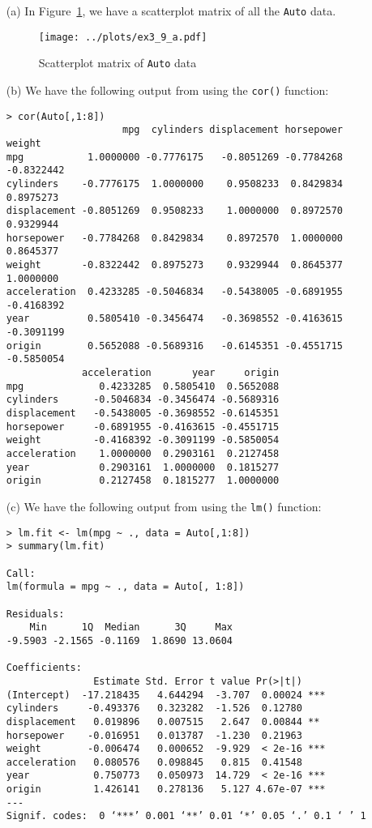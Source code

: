 
\begin{itemize}
    \item[(a)] In Figure~\ref{fig3_9scat}, we have a scatterplot matrix of all the 
        \verb|Auto| data.
        \begin{figure}[!ht]
            \texttt{[image: ../plots/ex3\_9\_a.pdf]}
            \caption{Scatterplot matrix of \texttt{Auto} data \label{fig3_9scat}}
        \end{figure}
    \item[(b)] We have the following output from using the \verb|cor()| function:
        \scriptsize\begin{verbatim}
> cor(Auto[,1:8])
                    mpg  cylinders displacement horsepower     weight
mpg           1.0000000 -0.7776175   -0.8051269 -0.7784268 -0.8322442
cylinders    -0.7776175  1.0000000    0.9508233  0.8429834  0.8975273
displacement -0.8051269  0.9508233    1.0000000  0.8972570  0.9329944
horsepower   -0.7784268  0.8429834    0.8972570  1.0000000  0.8645377
weight       -0.8322442  0.8975273    0.9329944  0.8645377  1.0000000
acceleration  0.4233285 -0.5046834   -0.5438005 -0.6891955 -0.4168392
year          0.5805410 -0.3456474   -0.3698552 -0.4163615 -0.3091199
origin        0.5652088 -0.5689316   -0.6145351 -0.4551715 -0.5850054
             acceleration       year     origin
mpg             0.4233285  0.5805410  0.5652088
cylinders      -0.5046834 -0.3456474 -0.5689316
displacement   -0.5438005 -0.3698552 -0.6145351
horsepower     -0.6891955 -0.4163615 -0.4551715
weight         -0.4168392 -0.3091199 -0.5850054
acceleration    1.0000000  0.2903161  0.2127458
year            0.2903161  1.0000000  0.1815277
origin          0.2127458  0.1815277  1.0000000
        \end{verbatim}\normalsize
    \item[(c)] We have the following output from using the \verb|lm()| function:
        \small\begin{verbatim}
> lm.fit <- lm(mpg ~ ., data = Auto[,1:8])
> summary(lm.fit)

Call:
lm(formula = mpg ~ ., data = Auto[, 1:8])

Residuals:
    Min      1Q  Median      3Q     Max 
-9.5903 -2.1565 -0.1169  1.8690 13.0604 

Coefficients:
               Estimate Std. Error t value Pr(>|t|)    
(Intercept)  -17.218435   4.644294  -3.707  0.00024 ***
cylinders     -0.493376   0.323282  -1.526  0.12780    
displacement   0.019896   0.007515   2.647  0.00844 ** 
horsepower    -0.016951   0.013787  -1.230  0.21963    
weight        -0.006474   0.000652  -9.929  < 2e-16 ***
acceleration   0.080576   0.098845   0.815  0.41548    
year           0.750773   0.050973  14.729  < 2e-16 ***
origin         1.426141   0.278136   5.127 4.67e-07 ***
---
Signif. codes:  0 ‘***’ 0.001 ‘**’ 0.01 ‘*’ 0.05 ‘.’ 0.1 ‘ ’ 1


\end{verbatim}
\end{itemize}
